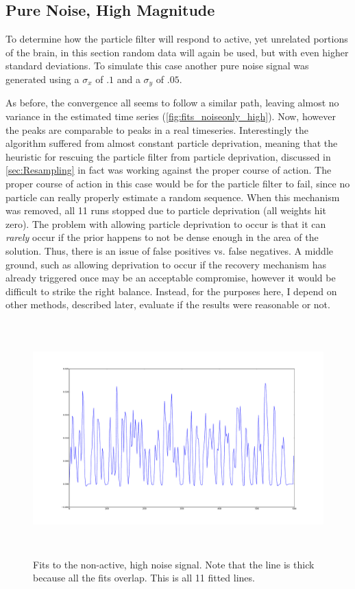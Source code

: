 \subsection{Pure Noise, High Magnitude}
\label{sec:PureNoiseHighMag}
To determine how the particle filter will respond to active, yet unrelated
portions of the brain, in this section random data will again be used, but
with even higher standard deviations. To simulate this case another
pure noise signal was generated using a $\sigma_x$ of $.1$ and a $\sigma_y$ of $.05$.

As before, the convergence all seems to follow a similar path, leaving almost no
variance in the estimated time series (\autoref{fig:fits_noiseonly_high}). Now, however
the peaks are comparable to peaks in a real timeseries. Interestingly the algorithm
suffered from almost constant particle deprivation, meaning that the heuristic
for rescuing the particle filter from particle deprivation, discussed in
\autoref{sec:Resampling} in fact was working against the proper course of action. 
 The proper course of action in this case would be for the particle filter to fail,
 since no particle can really properly estimate a random sequence. When this mechanism
 was removed, all 11 runs stopped due to particle deprivation (all weights hit zero). 
 The problem with allowing particle deprivation to occur is that it can \emph{rarely}
 occur if the prior happens to not be dense enough in the area of the solution. Thus,
 there is an issue of false positives vs. false negatives. A middle ground, such as 
 allowing deprivation to occur if the recovery mechanism has already triggered once
 may be an acceptable compromise, however it would be difficult to strike the 
 right balance. Instead, for the purposes here, I depend on other methods, described
 later, evaluate if the results were reasonable or not. 

\begin{figure}[H]
\centering
\includegraphics[clip=true,trim=6cm 3cm 6cm 3cm,height=9cm]{images/fits_noiseonly_high}
\caption{Fits to the non-active, high noise signal. Note that the line is thick because all
the fits overlap. This is all 11 fitted lines.}
\label{fig:fits_noiseonly_high}
\end{figure}

